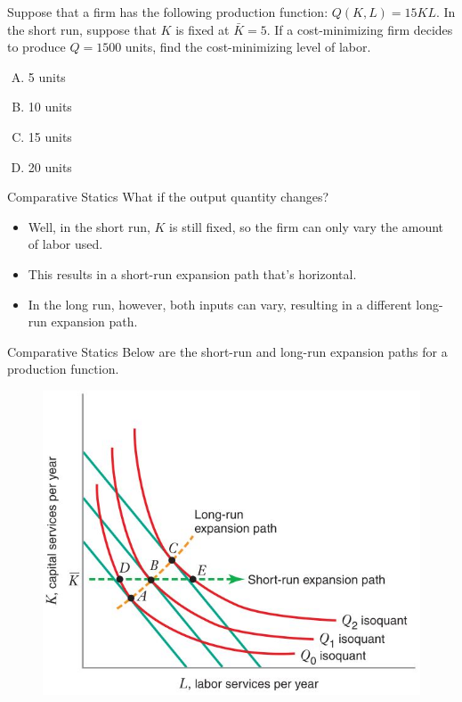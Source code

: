 \documentclass[11pt,t]{beamer}
\begin{document}
\begin{frame}

  \bigskip
  Suppose that a firm has the following production function: $Q(K,L)=15KL$. In the short run, suppose that $K$ is fixed at $\bar{K}=5$. If a cost-minimizing firm decides to produce $Q=1500$ units, find the cost-minimizing level of labor.

  \bigskip
  \begin{enumerate}[A)]
    \item 5 units
    \item 10 units
    \item 15 units
    \item 20 units
  \end{enumerate}
\end{frame}

\begin{frame}{Comparative Statics}
  What if the output quantity changes?

  \begin{itemize}
    \item Well, in the short run, $K$ is still fixed, so the firm can only vary the amount of labor used.
    
    \item This results in a short-run expansion path that's horizontal.
    
    \item In the long run, however, both inputs can vary, resulting in a different long-run expansion path.
  \end{itemize}


\end{frame}

\begin{frame}{Comparative Statics}
  Below are the short-run and long-run expansion paths for a production function.

  \begin{figure}
    \includegraphics[width=0.6\linewidth]{figures/fig7_14.jpg}
  \end{figure}
\end{frame}
\end{document}
